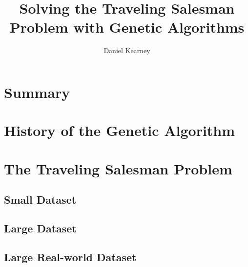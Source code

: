 \documentclass[UTF8]{report}
\begin{document}
\title{%
  Solving the Traveling Salesman Problem with Genetic Algorithms 
}

\author{Daniel Kearney}

\maketitle

\tableofcontents
\pagebreak

\section{Summary}

\section{History of the Genetic Algorithm}

\section{The Traveling Salesman Problem}









\subsection{Small Dataset}

\subsection{Large Dataset}

\subsection{Large Real-world Dataset}
\end{document}
